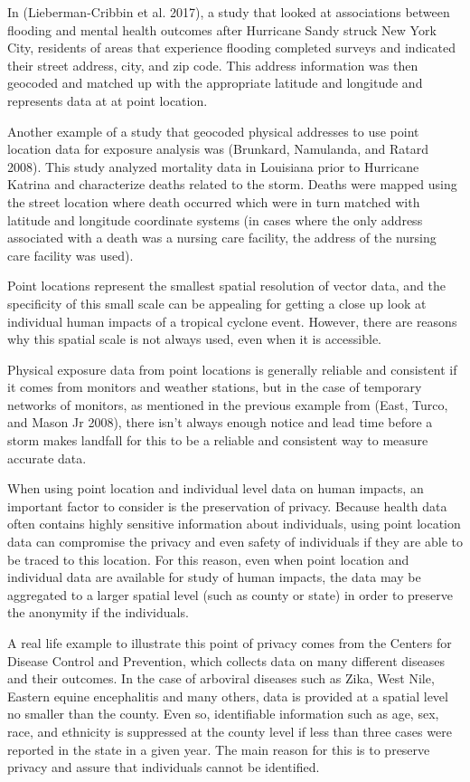 \documentclass[
]{article}
\begin{document}
In (Lieberman-Cribbin et al. 2017), a study that looked at associations
between flooding and mental health outcomes after Hurricane Sandy struck
New York City, residents of areas that experience flooding completed
surveys and indicated their street address, city, and zip code. This
address information was then geocoded and matched up with the
appropriate latitude and longitude and represents data at at point
location.

Another example of a study that geocoded physical addresses to use point
location data for exposure analysis was (Brunkard, Namulanda, and Ratard
2008). This study analyzed mortality data in Louisiana prior to
Hurricane Katrina and characterize deaths related to the storm. Deaths
were mapped using the street location where death occurred which were in
turn matched with latitude and longitude coordinate systems (in cases
where the only address associated with a death was a nursing care
facility, the address of the nursing care facility was used).

Point locations represent the smallest spatial resolution of vector
data, and the specificity of this small scale can be appealing for
getting a close up look at individual human impacts of a tropical
cyclone event. However, there are reasons why this spatial scale is not
always used, even when it is accessible.

Physical exposure data from point locations is generally reliable and
consistent if it comes from monitors and weather stations, but in the
case of temporary networks of monitors, as mentioned in the previous
example from (East, Turco, and Mason Jr 2008), there isn't always enough
notice and lead time before a storm makes landfall for this to be a
reliable and consistent way to measure accurate data.

When using point location and individual level data on human impacts, an
important factor to consider is the preservation of privacy. Because
health data often contains highly sensitive information about
individuals, using point location data can compromise the privacy and
even safety of individuals if they are able to be traced to this
location. For this reason, even when point location and individual data
are available for study of human impacts, the data may be aggregated to
a larger spatial level (such as county or state) in order to preserve
the anonymity if the individuals.

A real life example to illustrate this point of privacy comes from the
Centers for Disease Control and Prevention, which collects data on many
different diseases and their outcomes. In the case of arboviral diseases
such as Zika, West Nile, Eastern equine encephalitis and many others,
data is provided at a spatial level no smaller than the county. Even so,
identifiable information such as age, sex, race, and ethnicity is
suppressed at the county level if less than three cases were reported in
the state in a given year. The main reason for this is to preserve
privacy and assure that individuals cannot be identified.
\end{document}
